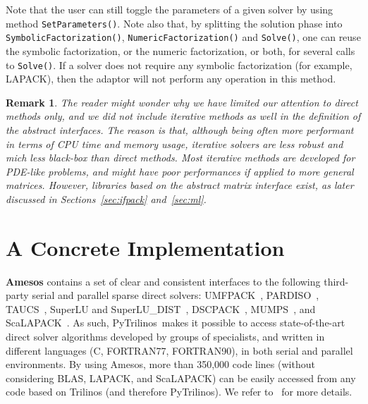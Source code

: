 \documentclass[acmtocl]{acmtrans2m}
\newtheorem{remark}{Remark}
\begin{document}
Note that the user can still toggle the parameters of a given solver by using
method \verb!SetParameters()!. Note also that, by splitting the solution phase
into \verb!SymbolicFactorization()!, \verb!NumericFactorization()! and
\verb!Solve()!, one can reuse the symbolic factorization, or the numeric
factorization, or both, for several calls to \verb!Solve()!. If a solver does
not require any symbolic factorization (for example, LAPACK), then the adaptor
will not perform any operation in this method.

\begin{remark}
The reader might wonder why we have limited our attention to direct methods only, and
we did not include iterative methods as well in the definition of the abstract
interfaces. The reason is that, although
being often more performant in terms of CPU time and memory usage, iterative
solvers are less robust and mich less black-box than direct methods. Most
iterative methods are developed for PDE-like problems, and might have poor
performances if applied to more general matrices. However, libraries based on
the abstract matrix interface exist, as later discussed in
Sections~\ref{sec:ifpack} and~\ref{sec:ml}.
\end{remark}

\section{A Concrete Implementation}

{\bf Amesos} contains a set of clear and consistent interfaces
  to the following third-party serial and parallel sparse direct
  solvers: UMFPACK~\cite{umfpack-acm-toms},
  PARDISO~\cite{oskl:04-etna,sg:04-fgcs},
  TAUCS~\cite{rozin04locality,rotkin04design,irony04parallel}, SuperLU
  and SuperLU\_DIST~\cite{superlu-manual},
  DSCPACK~\cite{dscpack-manual}, MUMPS~\cite{mumps-manual}, and
  ScaLAPACK~\cite{scalapack-book,scalapack}.  As such,
  PyTrilinos\ makes it possible to access state-of-the-art direct
  solver algorithms developed by groups of specialists, and written in
  different languages (C, FORTRAN77, FORTRAN90), in both serial and
  parallel environments.  By using Amesos, more than 350,000 code
  lines (without considering BLAS, LAPACK, and ScaLAPACK) can be
  easily accessed from any code based on Trilinos (and therefore
  PyTrilinos).  We refer
  to~\cite{Amesos-Reference-Guide,Amesos-Design} for more details.
\end{document}
